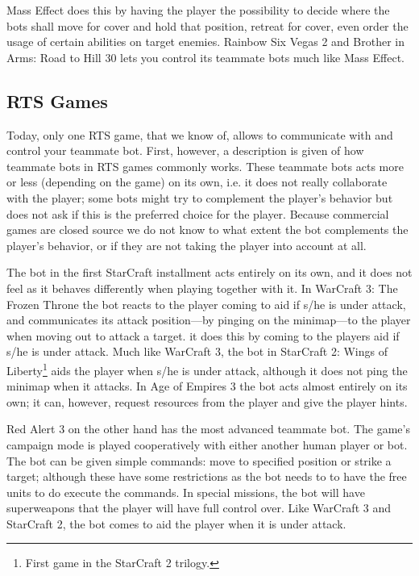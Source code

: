 Mass Effect\cite{masseffect} does this by having the player the possibility to decide where the bots shall move for cover and hold that position, retreat for cover, even order the usage of certain abilities on target enemies. Rainbow Six Vegas 2\cite{rainbow6} and Brother in Arms: Road to Hill 30\cite{brotherinarms} lets you control its teammate bots much like Mass Effect.


\subsection{RTS Games}
Today, only one RTS game, that we know of, allows to communicate with and control your teammate bot. First, however, a description is given of how teammate bots in RTS games commonly works. These teammate bots acts more or less (depending on the game) on its own, i.e. it does not really collaborate with the player; some bots might try to complement the player's behavior but does not ask if this is the preferred choice for the player. Because commercial games are closed source we do not know to what extent the bot complements the player's behavior, or if they are not taking the player into account at all.

The bot in the first StarCraft\cite{scbw} installment acts entirely on its own, and it does not feel as it behaves differently when playing together with it. In WarCraft 3: The Frozen Throne\cite{wc3ft} the bot reacts to the player coming to aid if s/he is under attack, and communicates its attack position—by pinging on the minimap—to the player when moving out to attack a target. it does this by coming to the players aid if s/he is under attack. Much like WarCraft 3, the bot in StarCraft 2: Wings of Liberty\footnote{First game in the StarCraft 2 trilogy.}\cite{sc2wol} aids the player when s/he is under attack, although it does not ping the minimap when it attacks. In Age of Empires 3\cite{ageofempires3} the bot acts almost entirely on its own; it can, however, request resources from the player and give the player hints.

Red Alert 3\cite{redalert3} on the other hand has the most advanced teammate bot. The game’s campaign mode is played cooperatively with either another human player or bot. The bot can be given simple commands: move to specified position or strike a target; although these have some restrictions as the bot needs to to have the free units to do execute the commands. In special missions, the bot will have superweapons that the player will have full control over. Like WarCraft 3 and StarCraft 2, the bot comes to aid the player when it is under attack.